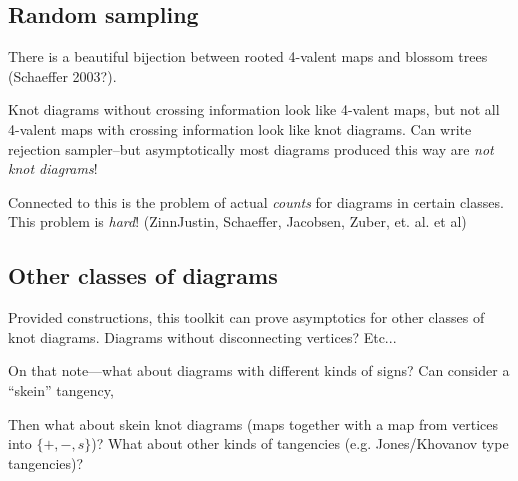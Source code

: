 \documentclass[12pt]{amsart}
\theoremstyle{definition}
\theoremstyle{plain}
\begin{document}
\subsection{Random sampling}
There is a beautiful bijection between rooted 4-valent maps and
blossom trees (Schaeffer 2003?).
\vspace{2in}

Knot diagrams without crossing information look like 4-valent maps,
but not all 4-valent maps with crossing information look like knot
diagrams. Can write rejection sampler--but asymptotically most
diagrams produced this way are \emph{not knot diagrams}!

Connected to this is the problem of actual \emph{counts} for diagrams
in certain classes. This problem is \emph{hard}! (ZinnJustin,
Schaeffer, Jacobsen, Zuber, et. al. et al)

\subsection{Other classes of diagrams}
Provided constructions, this toolkit can prove asymptotics for other
classes of knot diagrams. Diagrams without disconnecting vertices?
Etc...

On that note---what about diagrams with different kinds of signs? Can
consider a ``skein'' tangency,
\vspace{1in}

Then what about skein knot diagrams (maps together with a map from
vertices into $\{+, -, s\}$)? What about other kinds of tangencies
(e.g. Jones/Khovanov type tangencies)?
\end{document}
